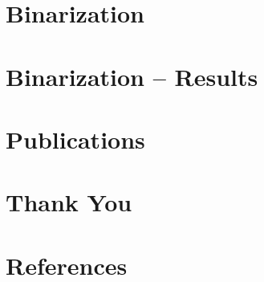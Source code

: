 \documentclass{beamer}
\begin{document}
\begin{frame}{\secname}
	
\end{frame}


\section{Binarization}

\begin{frame}{\secname}
	
\end{frame}


\section{Binarization – Results}

\begin{frame}[t]{\secname}
	\centering
	
\end{frame}


\iffalse
\section{Conclusion}

\begin{frame}{\secname}
	
\end{frame}
\fi


\section{Publications}

\begin{frame}{\secname}
	
\end{frame}


\section{Thank You}

\begin{frame}
	\centering
	
\end{frame}


\appendix


\section{References}
\end{document}

